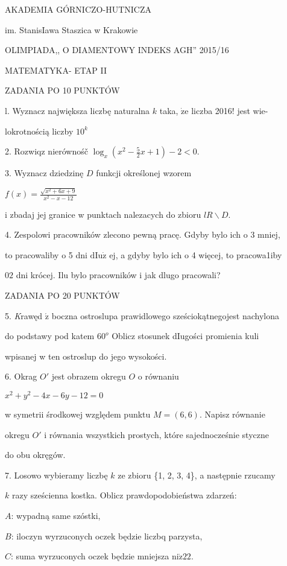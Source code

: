 \documentclass[a4paper,12pt]{article}
\begin{document}
AKADEMIA GÓRNICZO-HUTNICZA

im. StanisIawa Staszica w Krakowie

OLIMPIADA,, O DIAMENTOWY INDEKS AGH'' 2015/16

MATEMATYKA- ETAP II

ZADANIA PO 10 PUNKTÓW

l. Wyznacz największa liczbę naturalna $k$ taka, $\dot{\mathrm{z}}\mathrm{e}$ liczba 2016! jest wie-

lokrotnością liczby $10^{k}$

2. Rozwiqz nierównośč $\displaystyle \log_{x}(x^{2}-\frac{5}{2}x+1)-2<0.$

3. Wyznacz dziedzinę $D$ funkcji określonej wzorem

$f(x)=\displaystyle \frac{\sqrt{x^{2}+6x+9}}{x^{2}-x-12}$

i zbadaj jej granice w punktach nalezacych do zbioru $lR\backslash D.$

4. Zespolowi pracowników zlecono pewną pracę. Gdyby bylo ich o 3 mniej,

to pracowaliby o 5 dni $\mathrm{d}\mathrm{I}\mathrm{u}\dot{\mathrm{z}}$ ej, a gdyby bylo ich o 4 więcej, to pracowa1iby

$02$ dni krócej. Ilu bylo pracowników i jak dlugo pracowali?

ZADANIA PO 20 PUNKTÓW

5. {\it K}rawęd $\acute{\mathrm{z}}$ boczna ostroslupa prawidlowego sześciokątnegojest nachylona

do podstawy pod katem $60^{o}$ Oblicz stosunek dIugości promienia kuli

wpisanej w ten ostroslup do jego wysokości.

6. Okrag $O'$ jest obrazem okregu $O$ o równaniu

$x^{2}+y^{2}-4x-6y-12=0$

w symetrii środkowej względem punktu $M= (6,6)$. Napisz równanie

okregu $O'$ i równania wszystkich prostych, które sajednocześnie styczne

do obu okręgów.

7. Losowo wybieramy liczbę $k$ ze zbioru \{1, 2, 3, 4\}, a następnie rzucamy

$k$ razy sześcienna kostka. Oblicz prawdopodobieństwa zdarzeń:

$A$: wypadną same szóstki,

$B$: iloczyn wyrzuconych oczek będzie liczbq parzysta,

$C$: suma wyrzuconych oczek będzie mniejsza $\mathrm{n}\mathrm{i}\dot{\mathrm{z}}22.$
\end{document}
